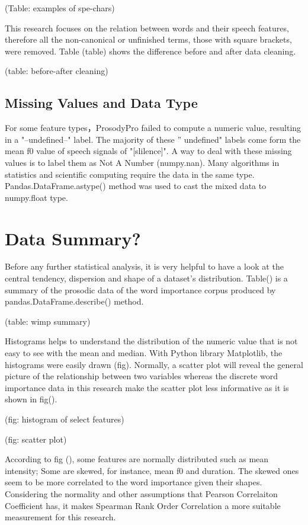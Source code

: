 (Table: examples of spe-chars)

This research focuses on the relation between words and their speech features, therefore all the non-canonical  or unfinished terms, those with square brackets, were removed. Table (table) shows the difference before and after data cleaning.

(table: before-after cleaning)


\subsection{Missing Values and Data Type }
 For some feature types，ProsodyPro failed to compute a numeric value, resulting in a "--undefined--" label. The majority of these '' undefined" labels come form the mean f0 value of speech signals of "[slilence]". A way to deal with these missing values is to label them as Not A Number (numpy.nan). Many algorithms in statistics and scientific computing require the data in the same type. Pandas.DataFrame.astype() method was used to cast the mixed data to numpy.float type.


\section{Data Summary?}
Before any further statistical analysis, it is very helpful to have a look at the central tendency, dispersion and shape of a dataset's distribution. Table() is a summary of the prosodic data of the word importance corpus produced by pandas.DataFrame.describe() method.

(table: wimp summary)

Histograms helps to understand the distribution of the numeric value that is not easy to see with the mean and median. With Python library Matplotlib, the histograms were easily drawn (fig). Normally, a scatter plot will reveal the general picture of the relationship between two variables whereas the discrete word importance data in this research make the scatter plot less informative as it is shown in fig().

(fig: histogram of select features)

(fig: scatter plot)

According to fig (), some features are normally distributed such as  mean intensity; Some are skewed, for instance, mean f0 and duration. The skewed ones seem to be more correlated to the word importance given their shapes. Considering the normality and other assumptions that Pearson Correlaiton Coefficient has, it makes Spearman Rank Order Correlation a more suitable measurement for this research.

